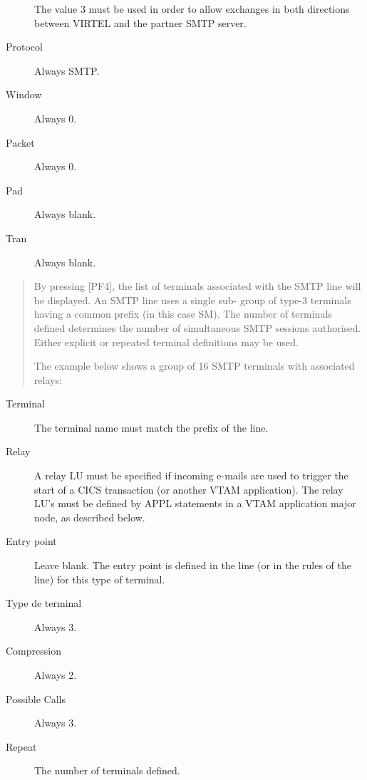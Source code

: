 \documentclass[letterpaper,10pt,english]{sphinxmanual}
\begin{document}
\begin{description}
The value 3 must be used in order to allow exchanges in both directions between VIRTEL and the partner SMTP server.

\item[{Protocol}] \leavevmode
Always SMTP.

\item[{Window}] \leavevmode
Always 0.

\item[{Packet}] \leavevmode
Always 0.

\item[{Pad}] \leavevmode
Always blank.

\item[{Tran}] \leavevmode
Always blank.

\end{description}

\begin{quote}

By pressing {[}PF4{]}, the list of terminals associated with the SMTP line will be displayed. An SMTP line uses a single sub- group of type-3 terminals having a common prefix (in this case SM). The number of terminals defined determines the number of simultaneous SMTP sessions authorised. Either explicit or repeated terminal definitions may be used.

The example below shows a group of 16 SMTP terminals with associated relays:
\end{quote}


\begin{description}
\item[{Terminal}] \leavevmode
The terminal name must match the prefix of the line.

\item[{Relay}] \leavevmode
A relay LU must be specified if incoming e-mails are used to trigger the start of a CICS transaction (or another VTAM application). The relay LU’s must be defined by APPL statements in a VTAM application major node, as described below.

\item[{Entry point}] \leavevmode
Leave blank. The entry point is defined in the line (or in the rules of the line) for this type of terminal.

\item[{Type de terminal}] \leavevmode
Always 3.

\item[{Compression}] \leavevmode
Always 2.

\item[{Possible Calls}] \leavevmode
Always 3.

\item[{Repeat}] \leavevmode
The number of terminals defined.

\end{description}
\end{document}
